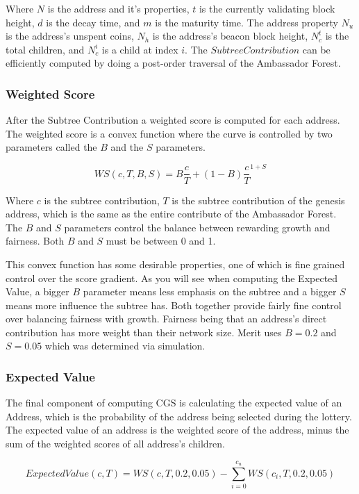 \documentclass{article}
\begin{document}
Where $N$ is the address and it's properties, $t$ is the currently validating
block height, $d$ is the decay time, and $m$ is the maturity time.
The address property $N_u$ is the address's unspent coins, $N_h$
is the address's beacon block height, $N_c^t$ is the total children, and 
$N_c^i$ is a child at index $i$.  The $Subtree Contribution$ can be efficiently
computed by doing a post-order traversal of the Ambassador Forest. 

\subsubsection{Weighted Score}

After the Subtree Contribution a weighted score is computed for each address.
The weighted score is a convex function where the curve is controlled by two parameters
called the $B$ and the $S$ parameters.  

$$WS(c, T, B, S) = B\frac{c}{T} + (1 - B) \frac{c}{T}^{1+S}$$

Where $c$ is the subtree contribution, $T$ is the subtree contribution of the 
genesis address, which is the same as the entire contribute of the Ambassador
Forest.  The $B$ and $S$ parameters control the balance between rewarding growth
and fairness.  Both $B$ and $S$ must be between 0 and 1.

This convex function has some desirable properties, one of which is fine grained
control over the score gradient.  As you will see when computing the Expected Value,
a bigger $B$ parameter means less emphasis on the subtree and a bigger $S$ means
more influence the subtree has.  Both together provide fairly fine control
over balancing fairness with growth.  Fairness being that an address's direct
contribution has more weight than their network size.  Merit uses $B=0.2$ and 
$S=0.05$ which was determined via simulation.

\subsubsection{Expected Value}

The final component of computing CGS is calculating the expected value of an 
Address, which is the probability of the address being selected during the lottery.
The expected value of an address is the weighted score of the address,
minus the sum of the weighted scores of all address's children.

$$ExpectedValue(c, T)  = WS(c, T, 0.2, 0.05) - \sum_{i=0}^{c_n} WS(c_i, T, 0.2, 0.05) $$
\end{document}
